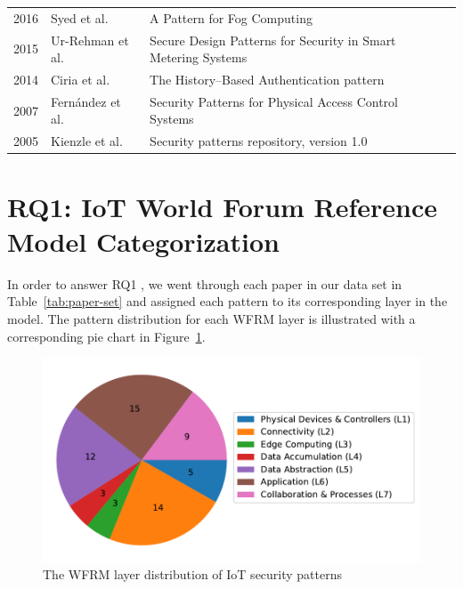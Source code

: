 \begin{longtable}[c]{llp{6.5cm}l}
	2016 & Syed et al. & A Pattern for Fog Computing & \cite{Syed2016} \\
	2015 & Ur-Rehman et al. & Secure Design Patterns for Security in Smart Metering Systems & \cite{Ur-Rehman2015} \\
	2014 & Ciria et al. & The History–Based Authentication pattern & \cite{Ciria2014} \\
	2007 & Fernández et al. & Security Patterns for Physical Access Control Systems & \cite{Fernandez2007} \\
	2005 & Kienzle et al. & Security patterns repository, version 1.0 & \cite{Kienzle2006} \\
	\hline
\end{longtable}


\section{RQ1: IoT World Forum Reference Model Categorization}\label{sec:rq1}
In order to answer RQ1 \emph{}, we went through each paper in our data set in Table~\ref{tab:paper-set} and assigned each pattern to its corresponding layer in the model. The pattern distribution for each WFRM layer is illustrated with a corresponding pie chart in Figure~\ref{fig:rq1}.

\begin{figure}[ht]
	\centering
	\includegraphics[width=0.9\linewidth]{img/RQ1}
	\caption{The WFRM layer distribution of IoT security patterns}
	\label{fig:rq1}
\end{figure}

